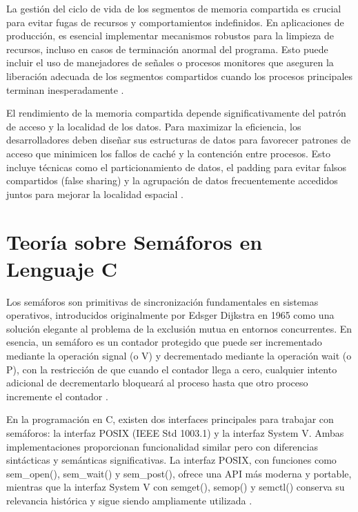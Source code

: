 {La gestión del ciclo de vida de los segmentos de memoria compartida es crucial para evitar fugas de recursos y comportamientos indefinidos. En aplicaciones de producción, es esencial implementar mecanismos robustos para la limpieza de recursos, incluso en casos de terminación anormal del programa. Esto puede incluir el uso de manejadores de señales o procesos monitores que aseguren la liberación adecuada de los segmentos compartidos cuando los procesos principales terminan inesperadamente \cite{kerrisk2010linux}.
\vspace{10pt}

El rendimiento de la memoria compartida depende significativamente del patrón de acceso y la localidad de los datos. Para maximizar la eficiencia, los desarrolladores deben diseñar sus estructuras de datos para favorecer patrones de acceso que minimicen los fallos de caché y la contención entre procesos. Esto incluye técnicas como el particionamiento de datos, el padding para evitar falsos compartidos (false sharing) y la agrupación de datos frecuentemente accedidos juntos para mejorar la localidad espacial \cite{drepper2007every}.

\section{Teoría sobre Semáforos en Lenguaje C}

Los semáforos son primitivas de sincronización fundamentales en sistemas operativos, introducidos originalmente por Edsger Dijkstra en 1965 como una solución elegante al problema de la exclusión mutua en entornos concurrentes. En esencia, un semáforo es un contador protegido que puede ser incrementado mediante la operación signal (o V) y decrementado mediante la operación wait (o P), con la restricción de que cuando el contador llega a cero, cualquier intento adicional de decrementarlo bloqueará al proceso hasta que otro proceso incremente el contador \cite{tanenbaum2015modern}.
\vspace{10pt}

En la programación en C, existen dos interfaces principales para trabajar con semáforos: la interfaz POSIX (IEEE Std 1003.1) y la interfaz System V. Ambas implementaciones proporcionan funcionalidad similar pero con diferencias sintácticas y semánticas significativas. La interfaz POSIX, con funciones como sem\_open(), sem\_wait() y sem\_post(), ofrece una API más moderna y portable, mientras que la interfaz System V con semget(), semop() y semctl() conserva su relevancia histórica y sigue siendo ampliamente utilizada \cite{stevens2013advanced}.
\vspace{10pt}

}
